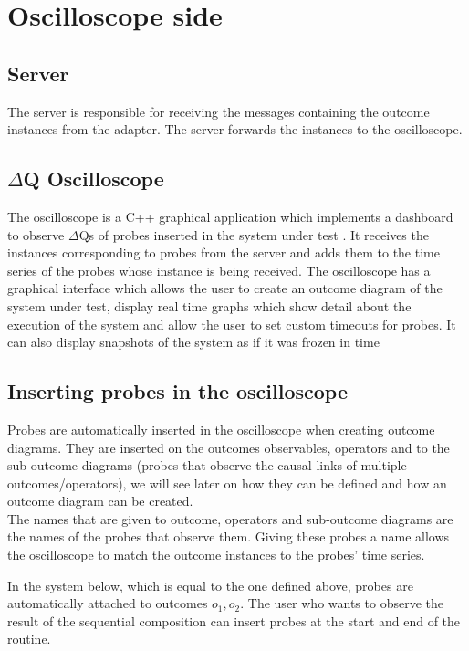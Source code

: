 \section{Oscilloscope side}
    \subsection{Server} The server is responsible for receiving the messages containing the outcome instances from the adapter. The server forwards the instances to the oscilloscope.
    
    \subsection{$\Delta$Q Oscilloscope} The oscilloscope is a C++ graphical application which implements a dashboard to observe $\Delta$Qs of probes inserted in the system under test \cite{osc-g}. It receives the instances corresponding to probes from the server and adds them to the time series of the probes whose instance is being received. 
    The oscilloscope has a graphical interface which allows the user to create an outcome diagram of the system under test, display real time graphs which show detail about the execution of the system and allow the user to set custom timeouts for probes. It can also display snapshots of the system as if it was frozen in time 

    \subsection{Inserting probes in the oscilloscope}
        Probes are automatically inserted in the oscilloscope when creating outcome diagrams. They are inserted on the outcomes observables, operators and to the sub-outcome diagrams (probes that observe the causal links of multiple outcomes/operators), we will see later on how they can be defined and how an outcome diagram can be created. \\
    The names that are given to outcome, operators and sub-outcome diagrams are the names of the probes that observe them. Giving these probes a name allows the oscilloscope to match the outcome instances to the probes' time series.

        In the system below, which is equal to the one defined above, probes are automatically attached to outcomes $o_1, o_2$. The user who wants to observe the result of the sequential composition can insert probes at the start and end of the routine. 
    
